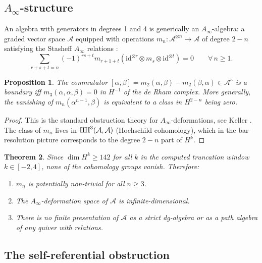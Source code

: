 \documentclass[reqno,10pt]{amsart}
\theoremstyle{plain}
\newtheorem{theorem}{Theorem}[section]
\newtheorem{proposition}[theorem]{Proposition}
\theoremstyle{definition}
\def\HH{{\rm HH}}
\begin{document}
\subsection{$A_\infty$-structure}

An algebra with generators in degrees 1 and 4 is generically an
$A_\infty$-algebra: a graded vector space $\mathcal{A}$ equipped with
operations $m_n: \mathcal{A}^{\otimes n} \to \mathcal{A}$ of degree $2-n$
satisfying the Stasheff $A_\infty$ relations \cite{Stasheff1963}:
\[
  \sum_{r+s+t=n} (-1)^{rs+t} m_{r+1+t}(\mathrm{id}^{\otimes r} \otimes m_s
  \otimes \mathrm{id}^{\otimes t}) = 0
  \qquad \forall\, n \geq 1.
\]

\begin{proposition}
  The commutator $[\alpha, \beta] = m_2(\alpha,\beta) - m_2(\beta,\alpha)
  \in \mathcal{A}^5$ is a boundary iff $m_3(\alpha,\alpha,\beta) = 0$ in
  $H^{-1}$ of the de Rham complex.  More generally, the vanishing of
  $m_n(\alpha^{n-1},\beta)$ is equivalent to a class in $H^{2-n}$ being zero.
\end{proposition}

\begin{proof}
  This is the standard obstruction theory for $A_\infty$-deformations, see
  Keller \cite{Keller2001}.  The class of $m_n$ lives in
  $\HH^3(\mathcal{A},\mathcal{A})$ (Hochschild cohomology), which in the
  bar-resolution picture corresponds to the degree $2-n$ part of $H^k$.
\end{proof}

\begin{theorem}\label{thm:infinite}
  Since $\dim H^k \geq 142$ for all $k$ in the computed truncation window
  $k \in [-2, 4]$, none of the cohomology groups vanish.  Therefore:
  \begin{enumerate}
    \item[\rm(i)] $m_n$ is potentially non-trivial for \emph{all} $n \geq 3$.
    \item[\rm(ii)] The $A_\infty$-deformation space of $\mathcal{A}$ is
          infinite-dimensional.
    \item[\rm(iii)] There is no finite presentation of $\mathcal{A}$ as a
          strict dg-algebra or as a path algebra of any quiver with relations.
  \end{enumerate}
\end{theorem}

\subsection{The self-referential obstruction}
\end{document}
